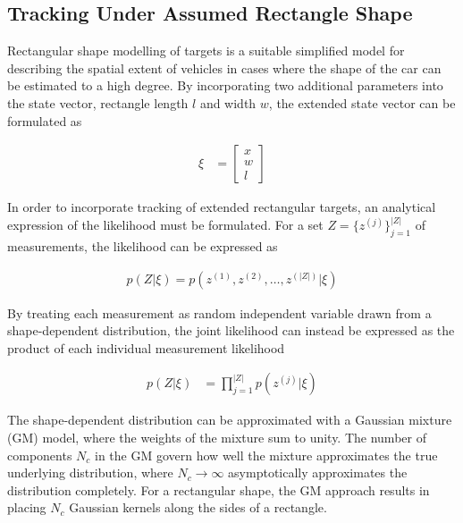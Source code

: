 \subsection{Tracking Under Assumed Rectangle Shape}

Rectangular shape modelling of targets is a suitable simplified model for describing the spatial extent of vehicles in cases where the shape of the car can be estimated to a high degree. By incorporating two additional parameters into the state vector, rectangle length $l$ and width $w$, the extended state vector can be formulated as

\begin{equation}
    \begin{split}
        \xi &=  
            \begin{bmatrix}
            x \\ 
            w \\ 
            l
            \end{bmatrix}
    \end{split}
\end{equation}

In order to incorporate tracking of extended rectangular targets, an analytical expression of the likelihood must be formulated. For a set $Z = \{z^{(j)}\}_{j=1}^{|Z|}$ of measurements, the likelihood can be expressed as 

\begin{equation}
    \begin{split}
        p(Z|\xi) = p(z^{(1)},z^{(2)},\dots,z^{(|Z|)}|\xi)
    \end{split}
\end{equation}

By treating each measurement as random independent variable drawn from a shape-dependent distribution, the joint likelihood can instead be expressed as the product of each individual measurement likelihood

\begin{equation}
    \begin{split}
        p(Z|\xi) &= \prod\limits_{j=1}^{|Z|} p(z^{(j)}|\xi)
    \end{split}\label{eq:zprod}
\end{equation}

The shape-dependent distribution can be approximated with a Gaussian mixture (GM) model, where the weights of the mixture sum to unity. The number of components $N_c$ in the GM govern how well the mixture approximates the true underlying distribution, where $N_c \rightarrow \infty$ asymptotically approximates the distribution completely. For a rectangular shape, the GM approach results in placing $N_c$ Gaussian kernels along the sides of a rectangle.

